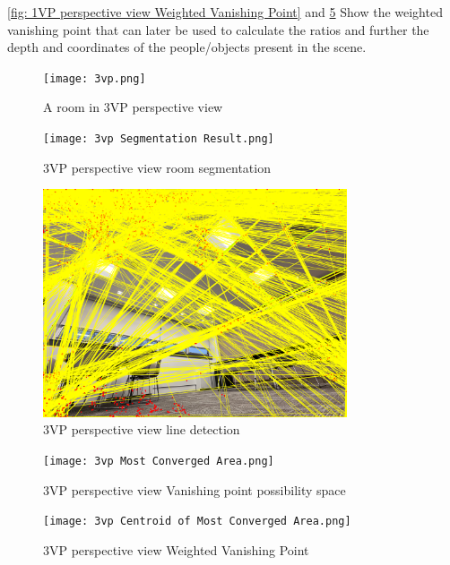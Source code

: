 \ref{fig: 1VP perspective view Weighted Vanishing Point} and \ref{fig: 3VP perspective view Weighted Vanishing Point} Show the weighted vanishing point that can later be used to calculate the ratios and further the depth and coordinates of the people/objects present in the scene.\newline

\begin{figure}[H]
    \centering
    \texttt{[image: 3vp.png]}
    \caption{A room in 3VP perspective view}
    \label{fig: A room in 3VP perspective view}
\end{figure}

\begin{figure}[H]
    \centering
    \texttt{[image: 3vp Segmentation Result.png]}
    \caption{3VP perspective view room segmentation}
    \label{fig: 3VP perspective view room segmentation}
\end{figure}

\begin{figure}[H]
    \centering
    \includegraphics[width=0.8\textwidth]{3vp Segmentation and Corner Detection Result.png}
    \caption{3VP perspective view line detection}
    \label{fig: 3VP perspective view line detection}
\end{figure}

\begin{figure}[H]
    \centering
    \texttt{[image: 3vp Most Converged Area.png]}
    \caption{3VP perspective view Vanishing point possibility space}
    \label{fig: 3VP perspective view Vanishing point possibility space}
\end{figure}

\begin{figure}[H]
    \centering
    \texttt{[image: 3vp Centroid of Most Converged Area.png]}
    \caption{3VP perspective view Weighted Vanishing Point}
    \label{fig: 3VP perspective view Weighted Vanishing Point}
\end{figure}


